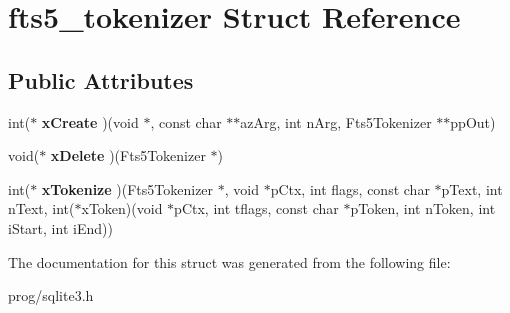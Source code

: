 \hypertarget{structfts5__tokenizer}{}\section{fts5\+\_\+tokenizer Struct Reference}
\label{structfts5__tokenizer}
\subsection*{Public Attributes}
\begin{DoxyCompactItemize}
\item 
\mbox{\label{structfts5__tokenizer_a61846ad000b2d38a1264c342c8201d5c}} 
int($\ast$ {\bfseries x\+Create} )(void $\ast$, const char $\ast$$\ast$az\+Arg, int n\+Arg, Fts5\+Tokenizer $\ast$$\ast$pp\+Out)
\item 
\mbox{\label{structfts5__tokenizer_aaaa88b9f3e50f0b1120a05fb1bbb251f}} 
void($\ast$ {\bfseries x\+Delete} )(Fts5\+Tokenizer $\ast$)
\item 
\mbox{\label{structfts5__tokenizer_ae65ca5a9b1e6d5c1ef09731fccefa577}} 
int($\ast$ {\bfseries x\+Tokenize} )(Fts5\+Tokenizer $\ast$, void $\ast$p\+Ctx, int flags, const char $\ast$p\+Text, int n\+Text, int($\ast$x\+Token)(void $\ast$p\+Ctx, int tflags, const char $\ast$p\+Token, int n\+Token, int i\+Start, int i\+End))
\end{DoxyCompactItemize}


The documentation for this struct was generated from the following file\+:\begin{DoxyCompactItemize}
\item 
prog/sqlite3.\+h\end{DoxyCompactItemize}
